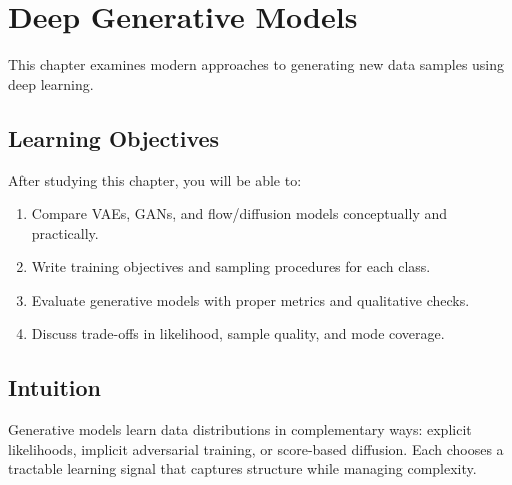 
\chapter{Deep Generative Models}
\label{chap:deep-generative-models}

This chapter examines modern approaches to generating new data samples using deep learning.


\section*{Learning Objectives}

After studying this chapter, you will be able to:

\begin{enumerate}
    \item Compare VAEs, GANs, and flow/diffusion models conceptually and practically.
    \item Write training objectives and sampling procedures for each class.
    \item Evaluate generative models with proper metrics and qualitative checks.
    \item Discuss trade-offs in likelihood, sample quality, and mode coverage.
\end{enumerate}



\section*{Intuition}

Generative models learn data distributions in complementary ways: explicit likelihoods, implicit adversarial training, or score-based diffusion. Each chooses a tractable learning signal that captures structure while managing complexity.












